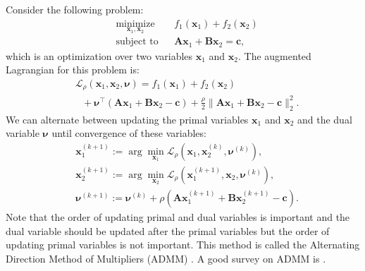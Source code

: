\documentclass[lang=cn,10pt]{gorgeousnbook}
\numberwithin{equation}{section}%
\numberwithin{figure}{section}%
\begin{document}
Consider the following problem:
\begin{equation}\label{equation_ADMM_optimization_problem}
\begin{aligned}
& \underset{\boldsymbol{x}_1, \boldsymbol{x}_2}{\text{minimize}}
& & f_1(\boldsymbol{x}_1) + f_2(\boldsymbol{x}_2) \\
& \text{subject to}
& & \boldsymbol{A} \boldsymbol{x}_1 + \boldsymbol{B} \boldsymbol{x}_2 = \boldsymbol{c},
\end{aligned}
\end{equation}
which is an optimization over two variables $\boldsymbol{x}_1$ and $\boldsymbol{x}_2$. 
The augmented Lagrangian for this problem is:
\begin{equation}\label{equation_ADMM_augmented_Lagrangian}
\begin{aligned}
&\mathcal{L}_\rho(\boldsymbol{x}_1, \boldsymbol{x}_2, \boldsymbol{\nu}) = f_1(\boldsymbol{x}_1) + f_2(\boldsymbol{x}_2) \\
&~~~ + \boldsymbol{\nu}^\top (\boldsymbol{A} \boldsymbol{x}_1 + \boldsymbol{B} \boldsymbol{x}_2 - \boldsymbol{c}) + \frac{\rho}{2} \|\boldsymbol{A} \boldsymbol{x}_1 + \boldsymbol{B} \boldsymbol{x}_2 - \boldsymbol{c}\|_2^2.
\end{aligned}
\end{equation}
We can alternate between updating the primal variables $\boldsymbol{x}_1$ and $\boldsymbol{x}_2$ and the dual variable $\boldsymbol{\nu}$ until convergence of these variables:
\begin{align}
& \boldsymbol{x}_1^{(k+1)} := \arg\min_{\boldsymbol{x}_1} \mathcal{L}_\rho(\boldsymbol{x}_1, \boldsymbol{x}_2^{(k)}, \boldsymbol{\nu}^{(k)}), \label{equation_ADMM_x1_update} \\
& \boldsymbol{x}_2^{(k+1)} := \arg\min_{\boldsymbol{x}_2} \mathcal{L}_\rho(\boldsymbol{x}_1^{(k+1)}, \boldsymbol{x}_2, \boldsymbol{\nu}^{(k)}), \label{equation_ADMM_x2_update} \\
& \boldsymbol{\nu}^{(k+1)} := \boldsymbol{\nu}^{(k)} + \rho (\boldsymbol{A} \boldsymbol{x}_1^{(k+1)} + \boldsymbol{B} \boldsymbol{x}_2^{(k+1)} - \boldsymbol{c}). \label{equation_ADMM_nu_update}
\end{align}
Note that the order of updating primal and dual variables is important and the dual variable should be updated after the primal variables but the order of updating primal variables is not important. 
This method is called the Alternating Direction Method of Multipliers (ADMM) \cite{gabay1976dual,glowinski1976finite}. 
A good survey on ADMM is \cite{boyd2011distributed}.
\end{document}
